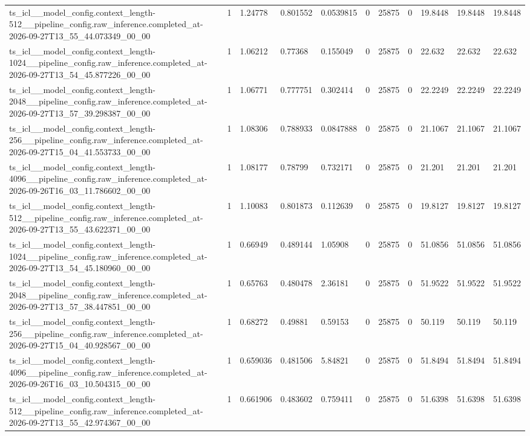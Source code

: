 \begin{tabular}{lllllllllll}
ts\_icl\_\_model\_config.context\_length-512\_\_pipeline\_config.raw\_inference.completed\_at-2026-09-27T13\_55\_44.073349\_00\_00 & 1 & 1.24778 & 0.801552 & 0.0539815 & 0 & 25875 & 0 & 19.8448 & 19.8448 & 19.8448 \\
ts\_icl\_\_model\_config.context\_length-1024\_\_pipeline\_config.raw\_inference.completed\_at-2026-09-27T13\_54\_45.877226\_00\_00 & 1 & 1.06212 & 0.77368 & 0.155049 & 0 & 25875 & 0 & 22.632 & 22.632 & 22.632 \\
ts\_icl\_\_model\_config.context\_length-2048\_\_pipeline\_config.raw\_inference.completed\_at-2026-09-27T13\_57\_39.298387\_00\_00 & 1 & 1.06771 & 0.777751 & 0.302414 & 0 & 25875 & 0 & 22.2249 & 22.2249 & 22.2249 \\
ts\_icl\_\_model\_config.context\_length-256\_\_pipeline\_config.raw\_inference.completed\_at-2026-09-27T15\_04\_41.553733\_00\_00 & 1 & 1.08306 & 0.788933 & 0.0847888 & 0 & 25875 & 0 & 21.1067 & 21.1067 & 21.1067 \\
ts\_icl\_\_model\_config.context\_length-4096\_\_pipeline\_config.raw\_inference.completed\_at-2026-09-26T16\_03\_11.786602\_00\_00 & 1 & 1.08177 & 0.78799 & 0.732171 & 0 & 25875 & 0 & 21.201 & 21.201 & 21.201 \\
ts\_icl\_\_model\_config.context\_length-512\_\_pipeline\_config.raw\_inference.completed\_at-2026-09-27T13\_55\_43.622371\_00\_00 & 1 & 1.10083 & 0.801873 & 0.112639 & 0 & 25875 & 0 & 19.8127 & 19.8127 & 19.8127 \\
ts\_icl\_\_model\_config.context\_length-1024\_\_pipeline\_config.raw\_inference.completed\_at-2026-09-27T13\_54\_45.180960\_00\_00 & 1 & 0.66949 & 0.489144 & 1.05908 & 0 & 25875 & 0 & 51.0856 & 51.0856 & 51.0856 \\
ts\_icl\_\_model\_config.context\_length-2048\_\_pipeline\_config.raw\_inference.completed\_at-2026-09-27T13\_57\_38.447851\_00\_00 & 1 & 0.65763 & 0.480478 & 2.36181 & 0 & 25875 & 0 & 51.9522 & 51.9522 & 51.9522 \\
ts\_icl\_\_model\_config.context\_length-256\_\_pipeline\_config.raw\_inference.completed\_at-2026-09-27T15\_04\_40.928567\_00\_00 & 1 & 0.68272 & 0.49881 & 0.59153 & 0 & 25875 & 0 & 50.119 & 50.119 & 50.119 \\
ts\_icl\_\_model\_config.context\_length-4096\_\_pipeline\_config.raw\_inference.completed\_at-2026-09-26T16\_03\_10.504315\_00\_00 & 1 & 0.659036 & 0.481506 & 5.84821 & 0 & 25875 & 0 & 51.8494 & 51.8494 & 51.8494 \\
ts\_icl\_\_model\_config.context\_length-512\_\_pipeline\_config.raw\_inference.completed\_at-2026-09-27T13\_55\_42.974367\_00\_00 & 1 & 0.661906 & 0.483602 & 0.759411 & 0 & 25875 & 0 & 51.6398 & 51.6398 & 51.6398 \\

\end{tabular}
